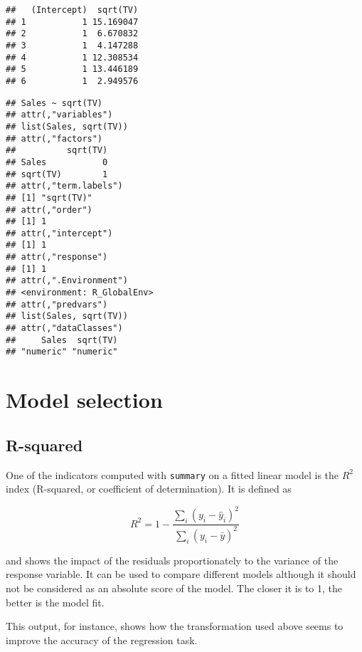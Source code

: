 \documentclass[
  oneside]{book}
\newenvironment{Shaded}{\begin{snugshade}}{\end{snugshade}}
\newcommand{\CommentTok}[1]{\textcolor[rgb]{0.56,0.35,0.01}{\textit{#1}}}
\newcommand{\NormalTok}[1]{#1}
\newcommand{\SpecialCharTok}[1]{\textcolor[rgb]{0.00,0.00,0.00}{#1}}
\begin{document}
\begin{verbatim}
##   (Intercept)  sqrt(TV)
## 1           1 15.169047
## 2           1  6.670832
## 3           1  4.147288
## 4           1 12.308534
## 5           1 13.446189
## 6           1  2.949576
\end{verbatim}

\begin{Shaded}
\end{Shaded}

\begin{verbatim}
## Sales ~ sqrt(TV)
## attr(,"variables")
## list(Sales, sqrt(TV))
## attr(,"factors")
##          sqrt(TV)
## Sales           0
## sqrt(TV)        1
## attr(,"term.labels")
## [1] "sqrt(TV)"
## attr(,"order")
## [1] 1
## attr(,"intercept")
## [1] 1
## attr(,"response")
## [1] 1
## attr(,".Environment")
## <environment: R_GlobalEnv>
## attr(,"predvars")
## list(Sales, sqrt(TV))
## attr(,"dataClasses")
##     Sales  sqrt(TV) 
## "numeric" "numeric"
\end{verbatim}

\hypertarget{model-selection}{%
\section{Model selection}\label{model-selection}}

\hypertarget{r-squared}{%
\subsection{R-squared}\label{r-squared}}

One of the indicators computed with \texttt{summary} on a fitted linear model
is the \(R^2\) index (R-squared, or coefficient of determination). It is defined as

\[
R^2 = 1 - \frac{\sum_i (y_i - \hat y_i)^2}{\sum_i (y_i - \bar y)^2}
\]

and shows the impact of the residuals proportionately to the variance
of the response variable. It can be used to compare different models
although it should not be considered as an absolute score of the model.
The closer it is to 1, the better is the model fit.

This output, for instance, shows how the transformation used above
seems to improve the accuracy of the regression task.
\end{document}
